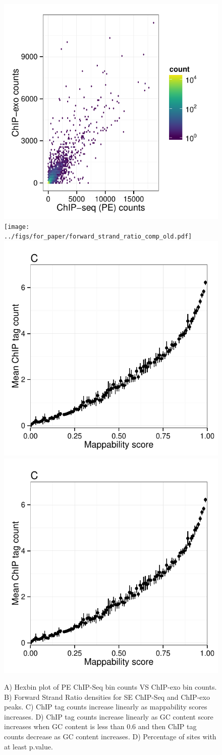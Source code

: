 \documentclass{bmcart}\usepackage[]{graphicx}\usepackage[]{color}
\begin{document}
\begin{figure}[h!]
  \centering
  \includegraphics[width = .46\textwidth,page = 3 ]{../figs/for_paper/ChIPseqPET_ChIPexo_tagCount_comparison.pdf}
  \texttt{[image: ../figs/for\_paper/forward\_strand\_ratio\_comp\_old.pdf]}
\includegraphics[width = .46\textwidth,page = 1]{../figs/for_paper/eukaryotic_bias_CTCF.pdf}
  \includegraphics[width = .46\textwidth,page = 2]{../figs/for_paper/eukaryotic_bias_CTCF.pdf}
  \caption{ A) Hexbin plot of PE ChIP-Seq bin counts VS ChIP-exo bin
    counts. B) Forward Strand Ratio densities for SE ChIP-Seq and
    ChIP-exo peaks. C) ChIP tag counts increase linearly as
    mappability scores increases. D) ChIP tag counts increase linearly
    as GC content score increases when GC content is less than 0.6 and
    then ChIP tag counts decrease as GC content increases. D)
    Percentage of sites with at least p.value.}
  \label{fig:comp}
\end{figure}
\end{document}

